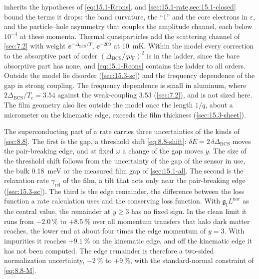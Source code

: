  inherits the hypotheses of \cref{eq:15.1-Rcons}, and \cref{sec:15.1-rate,sec:15.1-closed} bound the terms it drops: the band curvature, the ``1'' and the core electrons in $\varepsilon$, and the particle--hole asymmetry that couples the amplitude channel, each below $10^{-4}$ at these momenta. Thermal quasiparticles add the scattering channel of \cref{sec:7.2} with weight $\ee^{-\Delta_{\mathrm{BCS}}/T}$, $\ee^{-209}$ at \SI{10}{mK}. Within the model every correction to the absorptive part of order $(\Delta_{\mathrm{BCS}}/qv_{\mathrm{F}})^2$ is in the ladder, since the bare absorptive part has none, and \cref{eq:15.1-Rcons} contains the ladder to all orders. Outside the model lie disorder (\cref{sec:15.3-sc}) and the frequency dependence of the gap in strong coupling. The frequency dependence is small in aluminum, where $2\Delta_{\mathrm{BCS}}/T_c = 3.54$ against the weak-coupling 3.53 (\cref{sec:7.2}), and is not sized here. The film geometry also lies outside the model once the length $1/q$, about a micrometer on the kinematic edge, exceeds the film thickness (\cref{sec:15.3-sheet}).

The superconducting part of a rate carries three uncertainties of the kinds of \cref{sec:8.8}. The first is the gap, a threshold shift \cref{eq:8.8-shift}: $\delta E = 2\,\delta\Delta_{\mathrm{BCS}}$ moves the pair-breaking edge, and at fixed $\omega$ a change of the gap moves $y$. The size of the threshold shift follows from the uncertainty of the gap of the sensor in use, the bulk \SI{0.18}{meV} or the measured film gap of \cref{sec:15.1-al}. The second is the relaxation rate $\gamma_{\mathrm{rel}}$ of the film, a tilt that acts only near the pair-breaking edge (\cref{sec:15.3-sc}). The third is the edge remainder, the difference between the loss function a rate calculation uses and the conserving loss function. With $\mathfrak{g}_{\mathrm{I}}L^{\mathrm{nor}}$ as the central value, the remainder at $y \ge 3$ has no fixed sign. In the clean limit it runs from $-\SI{2.0}{\percent}$ to $+\SI{8.5}{\percent}$ over all momentum transfers that halo dark matter reaches, the lower end at about four times the edge momentum of $y = 3$. With impurities it reaches $+\SI{9.1}{\percent}$ on the kinematic edge, and off the kinematic edge it has not been computed. The edge remainder is therefore a two-sided normalization uncertainty, $-\SI{2}{\percent}$ to $+\SI{9}{\percent}$, with the standard-normal constraint of \cref{eq:8.8-M}.


